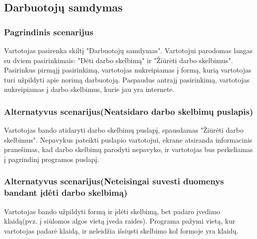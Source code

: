 \documentclass[oneside]{VUMIFPSkursinis}
\begin{document}
\subsection{Darbuotojų samdymas}
	\subsubsection{Pagrindinis scenarijus}
	Vartotojas pasirenka skiltį "Darbuotojų samdymas". Vartotojui parodomas langas su dviem pasirinkimais: "Dėti darbo skelbimą" ir "Žiūrėti darbo skelbimus". Pasirinkus pirmąjį pasirinkimą, vartotojas nukreipiamas į formą, kurią vartotojas turi užpildyti apie norimą darbuotoją. Paspaudus antrajį pasirinkimą, vartotojas nukreipiamas į darbo skelbimus, kurie jau yra internete.
	\subsubsection{Alternatyvus scenarijus(Neatsidaro darbo skelbimų puslapis)}
	Vartotojas bando atidaryti darbo skelbimų puslapį, spausdamas "Žiūrėti darbo skelbimus". Nepavykus pateikti puslapio vartotojui, ekrane atsiranda informacinis pranešimas, kad darbo skelbimų parodyti nepavyko, ir vartotojas bus perkeliamas į pagrindinį programos puslapį.
	\subsubsection{Alternatyvus scenarijus(Neteisingai suvesti duomenys bandant įdėti darbo skelbimą)}
	Vartotojas bando užpildyti formą ir įdėti skelbimą, bet padaro įvedimo klaidą(pvz. į siūlomos algos vietą įveda raides). Programa pažymi vietą, kur vartotojas padarė klaidą, ir neleidžia išsiųsti skelbimo kol formoje yra klaidų.
\end{document}
